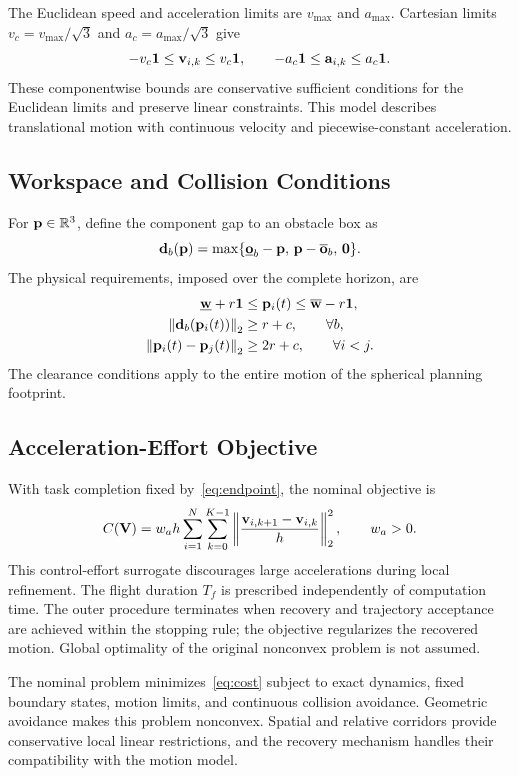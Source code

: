 The Euclidean speed and acceleration limits are $v_{\max}$ and $a_{\max}$. Cartesian limits $v_c=v_{\max}/\sqrt3$ and $a_c=a_{\max}/\sqrt3$ give
\begin{equation}
 -v_c\mathbf{1}\leq\mathbf{v}_{i,k}\leq v_c\mathbf{1},\qquad
 -a_c\mathbf{1}\leq\mathbf{a}_{i,k}\leq a_c\mathbf{1} .
 \label{eq:bounds}
\end{equation}
These componentwise bounds are conservative sufficient conditions for the Euclidean limits and preserve linear constraints. This model describes translational motion with continuous velocity and piecewise-constant acceleration.

\subsection{Workspace and Collision Conditions}
For $\mathbf{p}\in\mathbb{R}^3$, define the component gap to an obstacle box as
\begin{equation}
 \mathbf d_b(\mathbf{p})=\max\{\underline{\mathbf o}_b-\mathbf{p},\,
 \mathbf{p}-\overline{\mathbf o}_b,\,\mathbf0\}.
 \label{eq:gap}
\end{equation}
The physical requirements, imposed over the complete horizon, are
\begin{subequations}\label{eq:avoidance}\begin{align}
 \underline{\mathbf w}+r\mathbf{1}&\leq\mathbf{p}_i(t)\leq\overline{\mathbf w}-r\mathbf{1},\\
 \left\lVert \mathbf d_b(\mathbf{p}_i(t))\right\rVert_2&\geq r+c,\qquad \forall b,\\
 \left\lVert \mathbf{p}_i(t)-\mathbf{p}_j(t)\right\rVert_2&\geq 2r+c,\qquad \forall i<j.
\end{align}\end{subequations}
The clearance conditions apply to the entire motion of the spherical planning footprint.

\subsection{Acceleration-Effort Objective}
With task completion fixed by~\eqref{eq:endpoint}, the nominal objective is
\begin{equation}
 C(\mathbf V)=w_a h\sum_{i=1}^N\sum_{k=0}^{K-1}
 \left\|\frac{\mathbf{v}_{i,k+1}-\mathbf{v}_{i,k}}h\right\|_2^2,\qquad w_a>0.
 \label{eq:cost}
\end{equation}
This control-effort surrogate discourages large accelerations during local refinement. The flight duration $T_f$ is prescribed independently of computation time. The outer procedure terminates when recovery and trajectory acceptance are achieved within the stopping rule; the objective regularizes the recovered motion. Global optimality of the original nonconvex problem is not assumed.

The nominal problem minimizes~\eqref{eq:cost} subject to exact dynamics, fixed boundary states, motion limits, and continuous collision avoidance. Geometric avoidance makes this problem nonconvex. Spatial and relative corridors provide conservative local linear restrictions, and the recovery mechanism handles their compatibility with the motion model.
